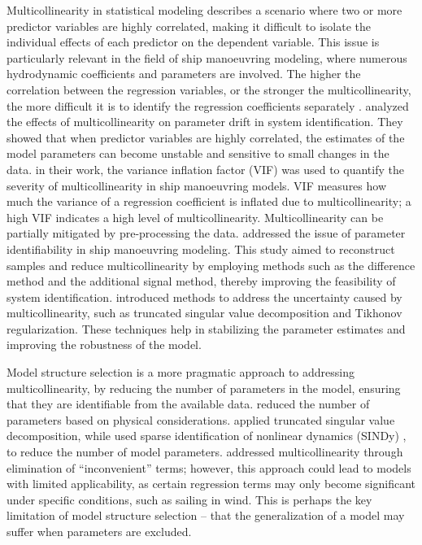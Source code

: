 Multicollinearity in statistical modeling describes a scenario where two or more predictor variables are highly correlated, making it difficult to isolate the individual effects of each predictor on the dependent variable. This issue is particularly relevant in the field of ship manoeuvring modeling, where numerous hydrodynamic coefficients and parameters are involved.
The higher the correlation between the regression variables, or the stronger the multicollinearity, the more difficult it is to identify the regression coefficients separately \cite{yoonIdentificationHydrodynamicCoefficients2003}.
\textcite{wangQuantifyingMulticollinearityShip2018} analyzed the effects of multicollinearity on parameter drift in system identification.  They showed that when predictor variables are highly correlated, the estimates of the model parameters can become unstable and sensitive to small changes in the data. in their work, the variance inflation factor (VIF) was used to quantify the severity of multicollinearity in ship manoeuvring models. VIF measures how much the variance of a regression coefficient is inflated due to multicollinearity; a high VIF indicates a high level of multicollinearity.
Multicollinearity can be partially mitigated by pre-processing the data.
\textcite{luoParameterIdentificationShip2016} addressed the issue of parameter identifiability in ship manoeuvring modeling. This study aimed to reconstruct samples and reduce multicollinearity by employing methods such as the difference method and the additional signal method, thereby improving the feasibility of system identification.
\textcite{xuUncertaintyAnalysisHydrodynamic2019} introduced methods to address the uncertainty caused by multicollinearity, such as truncated singular value decomposition and Tikhonov regularization. These techniques help in stabilizing the parameter estimates and improving the robustness of the model.

Model structure selection is a more pragmatic approach to addressing multicollinearity, by reducing the number of parameters in the model, ensuring that they are identifiable from the available data. \textcite{luoParameterIdentificationShip2016} reduced the number of parameters based on physical considerations. \textcite{costaRobustParameterEstimation2021} applied truncated singular value decomposition, while \textcite{liuPhysicsinformedIdentificationMarine2024} used sparse identification of nonlinear dynamics (SINDy) \cite{bruntonDiscoveringGoverningEquations2016}, to reduce the number of model parameters. 
\textcite{abkowitzMEASUREMENTHYDRODYNAMICCHARACTERISTICS1980} addressed multicollinearity through elimination of “inconvenient” terms; however, this approach could lead to models with limited applicability, as certain regression terms may only become significant under specific conditions, such as sailing in wind. This is perhaps the key limitation of model structure selection – that the generalization of a model may suffer when parameters are excluded.

